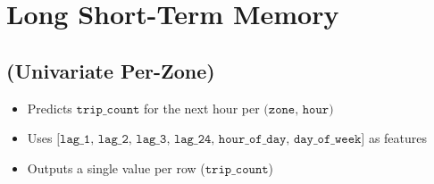 \documentclass[11pt]{article}
\begin{document}
    \section{Long Short-Term Memory}\label{long-short-term-memory}

\subsection{(Univariate Per-Zone)}\label{univariate-per-zone}

\begin{itemize}
\item
  Predicts \(\texttt{trip\_count}\) for the next hour per
  \(\texttt{(zone, hour)}\)
\item
  Uses
  \(\texttt{[lag\_1, lag\_2, lag\_3, lag\_24, hour\_of\_day, day\_of\_week]}\)
  as features
\item
  Outputs a single value per row (\(\texttt{trip\_count}\))
\end{itemize}
\end{document}
